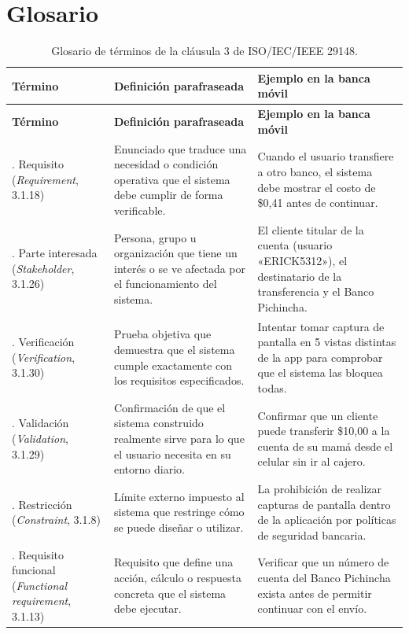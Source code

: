 \documentclass[11pt,a4paper]{article}
\begin{document}
\section{Glosario}
\label{sec:glosario}
{\footnotesize
\setlength{\tabcolsep}{3pt}
\renewcommand{\arraystretch}{1.25}
\begin{longtable}{>{\raggedright\arraybackslash}p{3cm}
                  >{\raggedright\arraybackslash}p{6.4cm}
                  >{\raggedright\arraybackslash}p{6.4cm}}
\caption{Glosario de términos de la cláusula 3 de ISO/IEC/IEEE 29148.}\label{tab:glosario}\\
\toprule
\textbf{Término} & \textbf{Definición parafraseada} & \textbf{Ejemplo en la banca móvil}\\
\midrule
\endfirsthead
\toprule
\textbf{Término} & \textbf{Definición parafraseada} & \textbf{Ejemplo en la banca móvil}\\
\midrule
\endhead
1. Requisito (\textit{Requirement}, 3.1.18) & Enunciado que traduce una necesidad o condición operativa que el sistema debe cumplir de forma verificable. & Cuando el usuario transfiere a otro banco, el sistema debe mostrar el costo de \$0{,}41 antes de continuar.\\
2. Parte interesada (\textit{Stakeholder}, 3.1.26) & Persona, grupo u organización que tiene un interés o se ve afectada por el funcionamiento del sistema. & El cliente titular de la cuenta (usuario «ERICK5312»), el destinatario de la transferencia y el Banco Pichincha.\\
3. Verificación (\textit{Verification}, 3.1.30) & Prueba objetiva que demuestra que el sistema cumple exactamente con los requisitos especificados. & Intentar tomar captura de pantalla en 5 vistas distintas de la app para comprobar que el sistema las bloquea todas.\\
4. Validación (\textit{Validation}, 3.1.29) & Confirmación de que el sistema construido realmente sirve para lo que el usuario necesita en su entorno diario. & Confirmar que un cliente puede transferir \$10{,}00 a la cuenta de su mamá desde el celular sin ir al cajero.\\
5. Restricción (\textit{Constraint}, 3.1.8) & Límite externo impuesto al sistema que restringe cómo se puede diseñar o utilizar. & La prohibición de realizar capturas de pantalla dentro de la aplicación por políticas de seguridad bancaria.\\
6. Requisito funcional (\textit{Functional requirement}, 3.1.13) & Requisito que define una acción, cálculo o respuesta concreta que el sistema debe ejecutar. & Verificar que un número de cuenta del Banco Pichincha exista antes de permitir continuar con el envío.\\

\end{longtable}}
\end{document}
